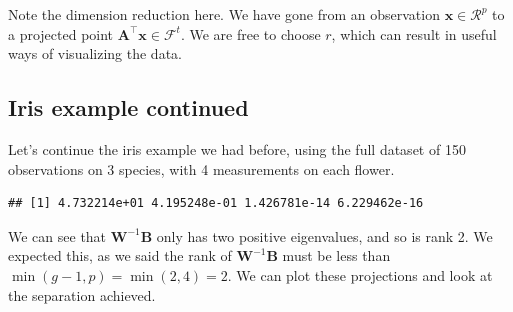 \documentclass[
]{book}
\newenvironment{Shaded}{\begin{snugshade}}{\end{snugshade}}
\newcommand{\AttributeTok}[1]{\textcolor[rgb]{0.77,0.63,0.00}{#1}}
\newcommand{\DecValTok}[1]{\textcolor[rgb]{0.00,0.00,0.81}{#1}}
\newcommand{\FunctionTok}[1]{\textcolor[rgb]{0.00,0.00,0.00}{#1}}
\newcommand{\NormalTok}[1]{#1}
\newcommand{\OtherTok}[1]{\textcolor[rgb]{0.56,0.35,0.01}{#1}}
\newcommand{\SpecialCharTok}[1]{\textcolor[rgb]{0.00,0.00,0.00}{#1}}
\newcommand{\StringTok}[1]{\textcolor[rgb]{0.31,0.60,0.02}{#1}}
\theoremstyle{definition}
\theoremstyle{definition}
\theoremstyle{definition}
\theoremstyle{definition}
\theoremstyle{remark}
\begin{document}
Note the dimension reduction here. We have gone from an observation \(\mathbf x\in \mathcal{R}^p\) to a projected point \(\mathbf A^\top\mathbf x\in \mathcal{F}^t\). We are free to choose \(r\), which can result in useful ways of visualizing the data.

\hypertarget{iris-example-continued-1}{%
\subsection{Iris example continued}\label{iris-example-continued-1}}

Let's continue the iris example we had before, using the full dataset of 150 observations on 3 species, with 4 measurements on each flower.

\begin{Shaded}
\end{Shaded}

\begin{verbatim}
## [1] 4.732214e+01 4.195248e-01 1.426781e-14 6.229462e-16
\end{verbatim}

We can see that \(\mathbf W^{-1}\mathbf B\) only has two positive eigenvalues, and so is rank 2. We expected this, as we said the rank of \(\mathbf W^{-1}\mathbf B\) must be less than \(\min(g-1,p)= \min(2,4)=2\). We can plot these projections and look at the separation achieved.

\begin{Shaded}
\end{Shaded}
\end{document}
